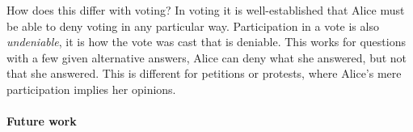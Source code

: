 How does this differ with voting?
In voting it is well-established that Alice must be able to deny voting in any 
particular way.
Participation in a vote is also \emph{undeniable}, it is how the vote was cast 
that is deniable.
This works for questions with a few given alternative answers, Alice can deny 
what she answered, but not that she answered.
This is different for petitions or protests, where Alice's mere participation 
implies her opinions.

%
%
%
%

\paragraph*{Future work}


